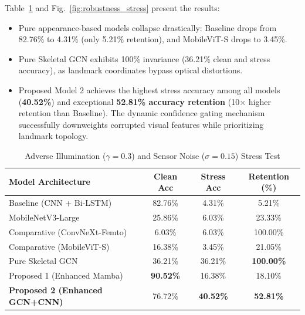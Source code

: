 \documentclass[journal]{IEEEtran}
\begin{document}
Table~\ref{tab:stress} and Fig.~\ref{fig:robustness_stress} present the results:
\begin{itemize}
    \item Pure appearance-based models collapse drastically: Baseline drops from 82.76\% to 4.31\% (only 5.21\% retention), and MobileViT-S drops to 3.45\%.
    \item Pure Skeletal GCN exhibits 100\% invariance (36.21\% clean and stress accuracy), as landmark coordinates bypass optical distortions.
    \item Proposed Model 2 achieves the highest stress accuracy among all models (\textbf{40.52\%}) and exceptional \textbf{52.81\% accuracy retention} (10$\times$ higher retention than Baseline). The dynamic confidence gating mechanism successfully downweights corrupted visual features while prioritizing landmark topology.
\end{itemize}

\begin{table}[t]
\centering
\caption{Adverse Illumination ($\gamma=0.3$) and Sensor Noise ($\sigma=0.15$) Stress Test}
\label{tab:stress}
\begin{tabular}{lccc}
\toprule
\textbf{Model Architecture} & \textbf{Clean Acc} & \textbf{Stress Acc} & \textbf{Retention (\%)} \\
\midrule
Baseline (CNN + Bi-LSTM) & 82.76\% & 4.31\% & 5.21\% \\
MobileNetV3-Large & 25.86\% & 6.03\% & 23.33\% \\
Comparative (ConvNeXt-Femto) & 6.03\% & 6.03\% & 100.00\% \\
Comparative (MobileViT-S) & 16.38\% & 3.45\% & 21.05\% \\
Pure Skeletal GCN & 36.21\% & 36.21\% & \textbf{100.00\%} \\
Proposed 1 (Enhanced Mamba) & \textbf{90.52\%} & 16.38\% & 18.10\% \\
\textbf{Proposed 2 (Enhanced GCN+CNN)} & 76.72\% & \textbf{40.52\%} & \textbf{52.81\%} \\
\bottomrule
\end{tabular}
\end{table}
\end{document}
